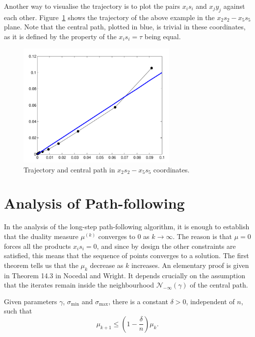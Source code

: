 Another way to visualise the trajectory is to plot the pairs $x_is_i$ and $x_jy_j$ against each other.
Figure~\ref{fig:fig2} shows the trajectory of the above example in the $x_2s_2-x_5s_5$ plane. Note that the  central path, plotted in blue, is trivial in these coordinates, as it is defined by the property of the $x_is_i=\tau$ being equal.
\begin{figure}[h!]
\centering
 \includegraphics[width=0.7\textwidth]{images/lect12b_cropped.pdf}
 \caption{Trajectory and central path in $x_2s_2-x_5s_5$ coordinates.}\label{fig:fig2}
\end{figure}

\section{Analysis of Path-following}
In the analysis of the long-step path-following algorithm, it is enough to establish that the duality measure $\mu^{(k)}$ converges to $0$ as $k\to \infty$. The reason is that $\mu=0$ forces all the products $x_is_i=0$, and since by design the other constraints are satisfied, this means that the sequence of points converges to a solution. The first theorem tells us that the $\mu_k$ decrease as $k$ increases. An elementary proof is given in Theorem 14.3 in Nocedal and Wright. It depends crucially on the assumption that the iterates remain inside the neighbourhood $\mathcal{N}_{-\infty}(\gamma)$ of the central path.

\begin{theorem}
 Given parameters $\gamma$, $\sigma_{\mathrm{min}}$ and $\sigma_{\mathrm{max}}$, there is a constant $\delta>0$, independent of $n$, such that
 \begin{equation}\label{thm:1}
  \mu_{k+1}\leq \left(1-\frac{\delta}{n}\right) \mu_k.
 \end{equation}
\end{theorem}

